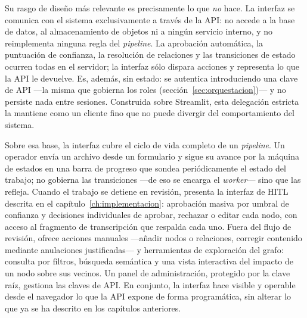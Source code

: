 Su rasgo de diseño más relevante es precisamente lo que \emph{no} hace. La interfaz se comunica con
el sistema exclusivamente a través de la \ac{API}: no accede a la base de datos, al almacenamiento de objetos
ni a ningún servicio interno, y no reimplementa ninguna regla del \textit{pipeline}. La aprobación
automática, la puntuación de confianza, la resolución de relaciones y las transiciones de estado ocurren
todas en el servidor; la interfaz sólo dispara acciones y representa lo que la \ac{API} le devuelve. Es,
además, sin estado: se autentica introduciendo una clave de \ac{API} —la misma que gobierna los roles
(sección~\ref{sec:orquestacion})— y no persiste nada entre sesiones. Construida sobre Streamlit,
esta delegación estricta la mantiene como un cliente fino que no puede divergir del comportamiento
del sistema.

Sobre esa base, la interfaz cubre el ciclo de vida completo de un \textit{pipeline}. Un operador
envía un archivo desde un formulario y sigue su avance por la máquina de estados en una barra de
progreso que sondea periódicamente el estado del trabajo; no gobierna las transiciones —de eso se
encarga el \textit{worker}— sino que las refleja. Cuando el trabajo se detiene en revisión, presenta
la interfaz de \acs{HITL} descrita en el capítulo~\ref{ch:implementacion}: aprobación masiva por
umbral de confianza y decisiones individuales de aprobar, rechazar o editar cada nodo, con acceso al
fragmento de transcripción que respalda cada uno. Fuera del flujo de revisión, ofrece acciones
manuales —añadir nodos o relaciones, corregir contenido mediante anulaciones justificadas— y
herramientas de exploración del grafo: consulta por filtros, búsqueda semántica y una vista
interactiva del impacto de un nodo sobre sus vecinos. Un panel de administración, protegido por la
clave raíz, gestiona las claves de \ac{API}. En conjunto, la interfaz hace visible y operable desde el
navegador lo que la \ac{API} expone de forma programática, sin alterar lo que ya se ha descrito en los
capítulos anteriores.
